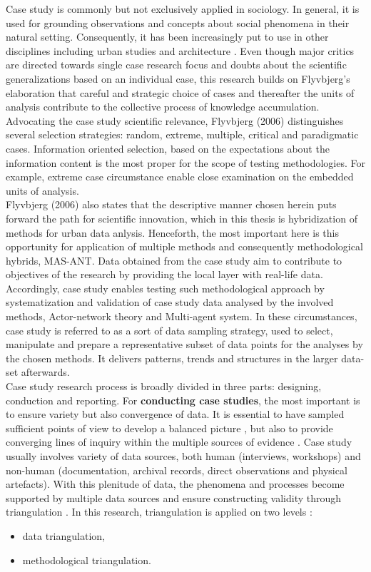 \documentclass[11pt]{report}
\begin{document}
Case study is commonly but not exclusively applied in sociology. In general, it is used for grounding observations and concepts about social phenomena in their natural setting. Consequently, it has been increasingly put to use in other disciplines including urban studies and architecture . Even though major critics are directed towards single case research focus and doubts about the scientific generalizations based on an individual case, this research builds on Flyvbjerg's elaboration  that careful and strategic choice of cases and thereafter the units of analysis contribute to the collective process of knowledge accumulation. Advocating the case study scientific relevance, Flyvbjerg (2006) distinguishes several selection strategies: random, extreme, multiple, critical and paradigmatic cases. Information oriented selection, based on the expectations about the information content is the most proper for the scope of testing methodologies. For example, extreme case circumstance enable close examination on the embedded units of analysis.
\\
Flyvbjerg (2006) also states that the descriptive manner chosen herein puts forward the path for scientific innovation, which in this thesis is hybridization of methods for urban data anlysis. Henceforth, the most important here is this opportunity for application of multiple methods  and consequently methodological hybrids, MAS-ANT. Data obtained from the case study aim to contribute to objectives of the research by providing the local layer with real-life data. Accordingly, case study enables testing such methodological approach by systematization and validation of case study data analysed by the involved methods, Actor-network theory and Multi-agent system. In these circumstances, case study is referred to as a sort of data sampling strategy, used to select, manipulate and prepare a representative subset of data points for the analyses by the chosen methods. It delivers patterns, trends and structures in the larger data-set afterwards.
\\
Case study research process is broadly divided in three parts: designing, conduction and reporting. For \textbf{conducting case studies}, the most important is to ensure variety but also convergence of data. It is essential to have  sampled  sufficient  points  of  view  to  develop  a balanced picture , but also to provide converging lines of inquiry within the multiple sources of evidence . Case study usually involves  variety of data sources, both human (interviews, workshops) and non-human (documentation, archival records, direct observations and physical artefacts). With this plenitude of data, the phenomena and processes become supported by multiple data sources and ensure constructing validity through triangulation . In this research, triangulation is applied on two levels :
\begin{itemize}
\item data triangulation,
\item methodological triangulation. 
\end{itemize}
\end{document}
